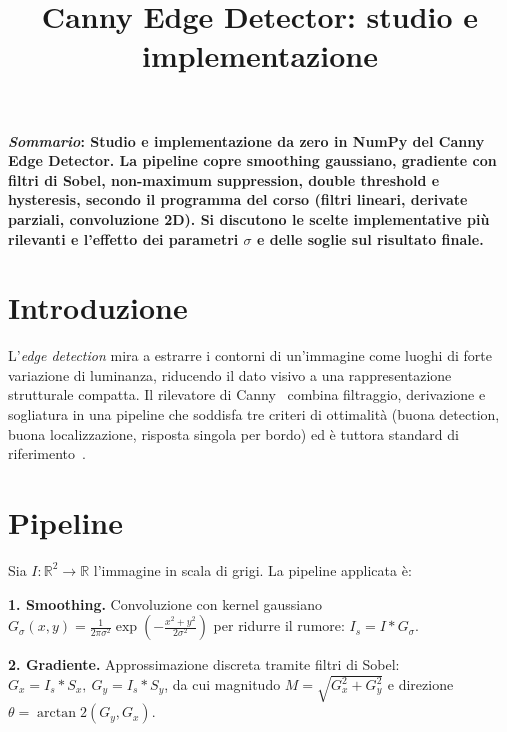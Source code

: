\documentclass[conference,9pt]{IEEEtran}
\begin{document}
\title{Canny Edge Detector: studio e implementazione}

\author{
}

\maketitle

{\footnotesize\noindent\textbf{\textit{Sommario}: Studio e implementazione da zero in NumPy del Canny Edge Detector. La pipeline copre smoothing gaussiano, gradiente con filtri di Sobel, non-maximum suppression, double threshold e hysteresis, secondo il programma del corso (filtri lineari, derivate parziali, convoluzione 2D). Si discutono le scelte implementative pi\`u rilevanti e l'effetto dei parametri $\sigma$ e delle soglie sul risultato finale.}\par}
\vspace{0.8\baselineskip}

\section{Introduzione}
L'\textit{edge detection} mira a estrarre i contorni di un'immagine come
luoghi di forte variazione di luminanza, riducendo il dato visivo a una
rappresentazione strutturale compatta. Il rilevatore di
Canny~\cite{canny1986} combina filtraggio, derivazione e sogliatura in una
pipeline che soddisfa tre criteri di ottimalit\`a (buona detection, buona
localizzazione, risposta singola per bordo) ed \`e tuttora standard di
riferimento~\cite{gonzalez}.

\section{Pipeline}
Sia $I:\mathbb{R}^2\to\mathbb{R}$ l'immagine in scala di grigi. La pipeline
applicata \`e:

\textbf{1. Smoothing.} Convoluzione con kernel gaussiano
$G_\sigma(x,y)=\frac{1}{2\pi\sigma^2}\exp\!\left(-\frac{x^2+y^2}{2\sigma^2}\right)$
per ridurre il rumore: $I_s = I * G_\sigma$.

\textbf{2. Gradiente.} Approssimazione discreta tramite filtri di Sobel:
$G_x = I_s * S_x,\ G_y = I_s * S_y$, da cui magnitudo
$M=\sqrt{G_x^2+G_y^2}$ e direzione $\theta=\arctan2(G_y,G_x)$.
\end{document}
